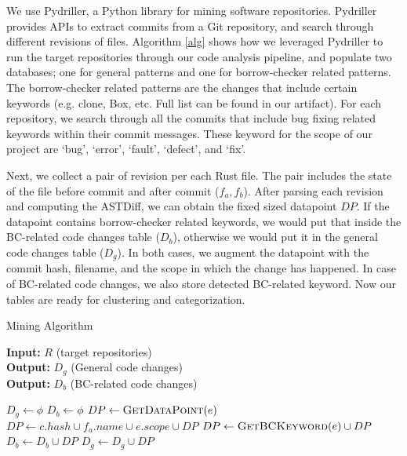 We use Pydriller, a Python library for mining software repositories. Pydriller provides APIs to extract commits from a Git repository, and search through different revisions of files. Algorithm \ref{alg} shows how we leveraged Pydriller to run the target repositories through our code analysis pipeline, and populate two databases; one for general patterns and one for borrow-checker related patterns. The borrow-checker related patterns are the changes that include certain keywords (e.g. clone, Box, etc. Full list can be found in our artifact). For each repository, we search through all the commits that include bug fixing related keywords within their commit messages. These keyword for the scope of our project are `bug', `error', `fault', `defect', and `fix'. 

Next, we collect a pair of revision per each Rust file. The pair includes the state of the file before commit and after commit ($f_a, f_b$). After parsing each revision and computing the ASTDiff, we can obtain the fixed sized datapoint $DP$. If the datapoint contains borrow-checker related keywords, we would put that inside the BC-related code changes table ($D_b$), otherwise we would put it in the general code changes table ($D_g$). In both cases, we augment the datapoint with the commit hash, filename, and the scope in which the change has happened. In case of BC-related code changes, we also store detected BC-related keyword. Now our tables are ready for clustering and categorization.

\begin{algorithm}
\caption{\label{alg} Mining Algorithm}
\hspace*{2mm} \textbf{Input:} $R$ (target repositories)  \\
\hspace*{2mm} \textbf{Output:} $D_g$ (General code changes) \\
\hspace*{2mm} \textbf{Output:} $D_b$ (BC-related code changes)
\begin{algorithmic}
\State $D_g \leftarrow \phi$
\State $D_b \leftarrow \phi$
                    \State $DP \leftarrow \textsc{GetDataPoint}(e)$
                    \State $DP \leftarrow c.hash \cup f_a.name \cup e.scope \cup DP $
                        \State $DP \leftarrow \textsc{GetBCKeyword}(e) \cup DP $
                        \State $D_b \leftarrow D_b \cup DP$
                    \Else
                        \State $D_g \leftarrow D_g \cup DP$
                    \EndIf
                \EndFor
            \EndFor
        \EndIf
    \EndFor
\EndFor
\end{algorithmic}
\end{algorithm}

